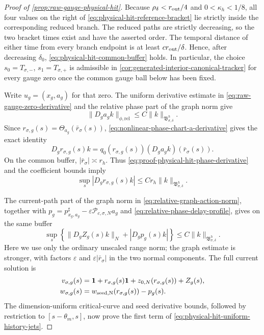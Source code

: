 \begin{proof}[Proof of
\cref{prop:raw-gauge-physical-hit}]
Because \(\rho_\delta<r_{\rm out}/4\) and
\(0<\kappa_h<1/8\), all four values on the right of
\cref{eq:physical-hit-reference-bracket} lie strictly inside the
corresponding reduced branch.  The reduced paths are strictly decreasing,
so the two bracket times exist and have the asserted order.  The temporal
distance of either time from every branch endpoint is at least
\(c r_{\rm out}/\delta\).  Hence,
after decreasing \(\delta_0\),
\cref{eq:physical-hit-common-buffer} holds.  In particular, the choice
\(s_0=T_{\sigma,-}\), \(s_1=T_{\sigma,+}\) is admissible in
\cref{cor:generated-interior-canonical-tracker} for every gauge zero once
the common gauge ball below has been fixed.

Write \(u_g=(x_g,a_g)\) for that zero.  The uniform derivative estimate in
\cref{eq:raw-gauge-zero-derivative} and the relative phase part of the graph
norm give
\begin{equation}
 \|D_ga_g k\|_{\phi,\mathrm{rel}}
 \le C\|k\|_{\mathfrak B_{\sigma,\delta}^h}.       \label{eq:proof-physical-hit-phase-derivative}
\end{equation}
Since
\(r_{\sigma,g}(s)=\Theta_{a_g}(\bar r_\sigma(s))\),
\cref{eq:nonlinear-phase-chart-a-derivative} gives the exact identity
\begin{equation}
 D_gr_{\sigma,g}(s)k
 =q_0(r_{\sigma,g}(s))
      (D_ga_gk)(\bar r_\sigma(s)).                 \label{eq:proof-physical-hit-r-derivative}
\end{equation}
On the common buffer, \(|\bar r_\sigma|\asymp r_h\).  Thus
\cref{eq:proof-physical-hit-phase-derivative} and the coefficient bounds
imply
\begin{equation}
 \sup_s|D_gr_{\sigma,g}(s)k|
 \le Cr_h\|k\|_{\mathfrak B_{\sigma,\delta}^h}.   \label{eq:proof-physical-hit-r-bound}
\end{equation}

The current-path part of the graph norm in
\cref{eq:relative-graph-action-norm}, together with
\(p_g=p_{x_g,a_g}^\sharp
       -\varepsilon\mathscr P_{c,\sigma,N}a_g\) and
\cref{eq:relative-phase-delay-profile}, gives on the same buffer
\begin{equation}
 \sup_s\left\{
   \|D_gZ_g(s)k\|_N+|D_gp_g(s)k|\right\}
 \le C\|k\|_{\mathfrak B_{\sigma,\delta}^h}.     \label{eq:proof-physical-hit-normal-bound}
\end{equation}
Here we use only the ordinary unscaled range norm; the graph estimate is
stronger, with factors \(\varepsilon\) and
\(\varepsilon|\bar r_\sigma|\) in the two normal components.  The full
current solution is
\begin{align*}
 v_{\sigma,g}(s)
 &=\mathbf1+r_{\sigma,g}(s)\mathbf1
       +z_{0,N}(r_{\sigma,g}(s))+Z_g(s),\\
 w_{\sigma,g}(s)
 &=w_{\rm seed,N}(r_{\sigma,g}(s))-p_g(s).
\end{align*}
The dimension-uniform critical-curve and seed derivative bounds, followed
by restriction to
\([s-\theta_m,s]\), now prove the first term of
\cref{eq:physical-hit-uniform-history-jets}.


\end{proof}
